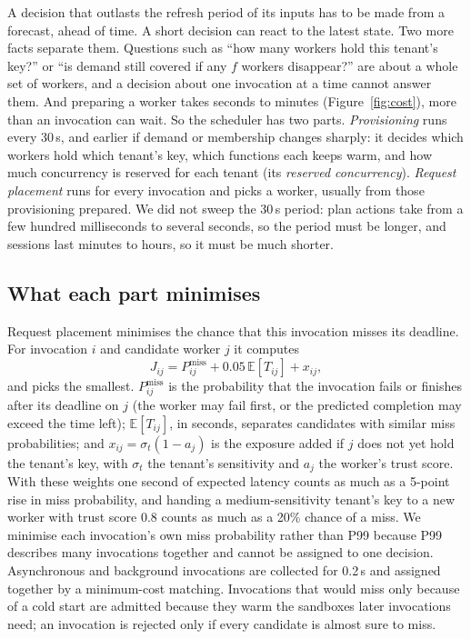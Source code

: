 A decision that outlasts the refresh period of its inputs has to be made from a forecast, ahead of time. A short decision can
react to the latest state. Two more facts separate them. Questions such as ``how many workers hold this tenant's key?'' or
``is demand still covered if any $f$ workers disappear?'' are about a whole set of workers, and a decision about one
invocation at a time cannot answer them. And preparing a worker takes seconds to minutes (Figure~\ref{fig:cost}), more than
an invocation can wait. So the scheduler has two parts. \emph{Provisioning} runs every 30\,s, and earlier if demand or
membership changes sharply: it decides which workers hold which tenant's key, which functions each keeps warm, and how much
concurrency is reserved for each tenant (its \emph{reserved concurrency}). \emph{Request placement} runs for every invocation and picks a worker, usually from those
provisioning prepared. We did not sweep the 30\,s period: plan actions take from a few hundred milliseconds to several seconds,
so the period must be longer, and sessions last minutes to hours, so it must be much shorter.

\subsection{What each part minimises}
Request placement minimises the chance that this invocation misses its deadline. For invocation $i$ and candidate worker
$j$ it computes
\begin{equation}
J_{ij}=P^{\text{miss}}_{ij}+0.05\,\mathbb{E}[T_{ij}]+x_{ij},
\label{eq:J}
\end{equation}
and picks the smallest. $P^{\text{miss}}_{ij}$ is the probability that the invocation fails or finishes after its deadline on
$j$ (the worker may fail first, or the predicted completion may exceed the time left); $\mathbb{E}[T_{ij}]$, in seconds,
separates candidates with similar miss probabilities; and $x_{ij}=\sigma_t(1-a_j)$ is the exposure added if $j$ does not yet
hold the tenant's key, with $\sigma_t$ the tenant's sensitivity and $a_j$ the worker's trust score. With these weights one
second of expected latency counts as much as a 5-point rise in miss probability, and handing a medium-sensitivity tenant's
key to a new worker with trust score 0.8 counts as much as a 20\% chance of a miss. We minimise each invocation's own miss
probability rather than P99 because P99 describes many invocations together and cannot be assigned to one decision.
Asynchronous and background invocations are collected for 0.2\,s and assigned together by a minimum-cost matching.
Invocations that would miss only because of a cold start are admitted because they warm the sandboxes later
invocations need; an invocation is rejected only if every candidate is almost sure to miss.

